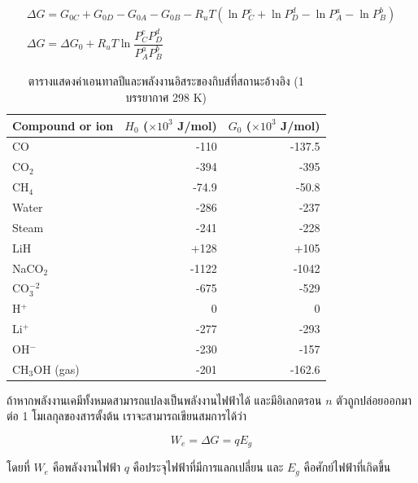 \message{ !name(solar.tex)}\documentclass[
a4paper,
svgnames,
openany,
justified,
]{tufte-book}
\begin{document}
\begin{gather}
  \Delta G = G_{0C} + G_{0D} - G_{0A} - G_{0B} - R_u T \left( \ln P_C^c + \ln P_D^d - \ln P_A^a - \ln P_B^b \right) \nonumber \\
  \Delta G = \Delta G_0 + R_u T \ln \dfrac{P_C^c P_D^d}{P_A^a P_B^b} 
\end{gather}


\begin{table}[h]
  \centering
  \begin{tabular}{lrr}
    \toprule
    Compound or ion  & $H_0$ ($\times 10^3$ J/mol) & $G_0$ ($\times 10^3$ J/mol) \\
    \midrule
    CO               & -110             & -137.5           \\
    CO$_2$           & -394             & -395             \\
    CH$_4$           & -74.9            & -50.8            \\
    Water            & -286             & -237             \\
    Steam            & -241             & -228             \\
    LiH              & +128             & +105             \\
    NaCO$_2$         & -1122            & -1042            \\
    CO$_3^{-2}$      & -675             & -529             \\
    H$^+$            & 0                & 0                \\
    Li$^+$           & -277             & -293             \\
    OH$^-$           & -230             & -157             \\
    CH$_3$OH (gas)   & -201             & -162.6           \\
    \bottomrule
  \end{tabular}
  \caption{ตารางแสดงค่าเอนทาลปีและพลังงานอิสระของกิบส์ที่สถานะอ้างอิง (1 บรรยากาศ 298 K) }
  \label{tab:h0 and g0}
\end{table} 

ถ้าหากพลังงานเคมีทั้งหมดสามารถแปลงเป็นพลังงานไฟฟ้าได้ และมีอิเลกตรอน $n$ ตัวถูกปล่อยออกมาต่อ 1 โมเลกุลของสารตั้งต้น เราจะสามารถเขียนสมการได้ว่า

\begin{equation}
  \label{eq:gfe to elec work}
  W_e= \Delta G = q E_g 
\end{equation}

โดยที่ $W_e$ คือพลังงานไฟฟ้า $q$ คือประจุไฟฟ้าที่มีการแลกเปลี่ยน และ $E_g$ คือศักย์ไฟฟ้าที่เกิดขึ้น
\end{document}
